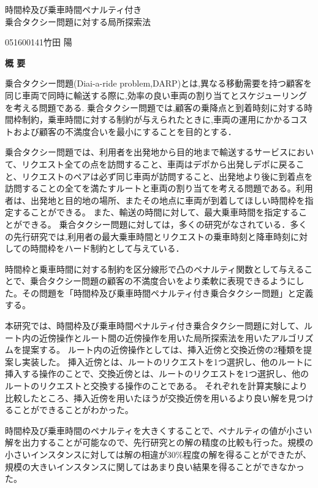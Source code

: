 \begin{center}
{\LARGE 時間枠及び乗車時間ペナルティ付き\\乗合タクシー問題に対する局所探索法}\\[0.5cm]
\end{center}
\hfill
{\large 051600141\qquad 竹田 陽}\\[0.5cm]
\begin{center}
{\Large \bf 概 要}\\
\end{center}


乗合タクシー問題(Diai-a-ride problem,DARP)とは,異なる移動需要を持つ顧客を同じ車両で同時に輸送する際に,効率の良い車両の割り当てとスケジューリングを考える問題である. 乗合タクシー問題では,顧客の乗降点と到着時刻に対する時間枠制約，乗車時間に対する制約が与えられたときに,車両の運用にかかるコストおよび顧客の不満度合いを最小にすることを目的とする．

乗合タクシー問題では、利用者を出発地から目的地まで輸送するサービスにおいて、リクエスト全ての点を訪問すること、車両はデポから出発しデポに戻ること、リクエストのペアは必ず同じ車両が訪問すること、出発地より後に到着点を訪問することの全てを満たすルートと車両の割り当てを考える問題である。利用者は、出発地と目的地の場所、またその地点に車両が到着してほしい時間枠を指定することができる。
また、輸送の時間に対して、最大乗車時間を指定することができる。
乗合タクシー問題に対しては，多くの研究がなされている．多くの先行研究では,利用者の最大乗車時間とリクエストの乗車時刻と降車時刻に対しての時間枠をハード制約として与えている．

時間枠と乗車時間に対する制約を区分線形で凸のペナルティ関数として与えることで、乗合タクシー問題の顧客の不満度合いをより柔軟に表現できるようにした。その問題を「時間枠及び乗車時間ペナルティ付き乗合タクシー問題」と定義する。

本研究では、時間枠及び乗車時間ペナルティ付き乗合タクシー問題に対して、ルート内の近傍操作とルート間の近傍操作を用いた局所探索法を用いたアルゴリズムを提案する。
ルート内の近傍操作としては、挿入近傍と交換近傍の2種類を提案し実装した。
挿入近傍とは、ルートのリクエストを1つ選択し、他のルートに挿入する操作のことで、交換近傍とは、ルートのリクエストを1つ選択し、他のルートのリクエストと交換する操作のことである。
それぞれを計算実験により比較したところ、挿入近傍を用いたほうが交換近傍を用いるより良い解を見つけることができることがわかった。

時間枠及び乗車時間のペナルティを大きくすることで、ペナルティの値が小さい解を出力することが可能なので、先行研究との解の精度の比較も行った。規模の小さいインスタンスに対しては解の相違が30\%程度の解を得ることができたが、規模の大きいインスタンスに関してはあまり良い結果を得ることができなかった。

